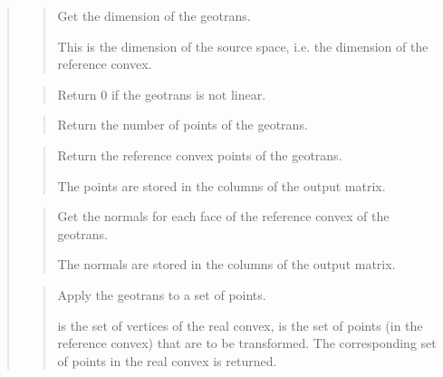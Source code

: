 \documentclass[a4paper,11pt,english]{sphinxmanual}
\begin{document}
\begin{quote}

\begin{quote}

Get the dimension of the geotrans.

This is the dimension of the source space, i.e. the dimension of
the reference convex.
\end{quote}

\begin{quote}

Return 0 if the geotrans is not linear.
\end{quote}

\begin{quote}

Return the number of points of the geotrans.
\end{quote}

\begin{quote}

Return the reference convex points of the geotrans.

The points are stored in the columns of the output matrix.
\end{quote}

\begin{quote}

Get the normals for each face of the reference convex of the geotrans.

The normals are stored in the columns of the output matrix.
\end{quote}

\begin{quote}

Apply the geotrans to a set of points.

 is the set of vertices of the real convex,  is the set
of points (in the reference convex) that are to be transformed.
The corresponding set of points in the real convex is returned.
\end{quote}


\end{quote}
\end{document}
